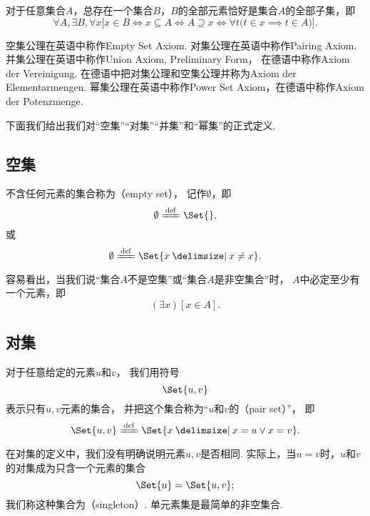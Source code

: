 \begin{axiom}[幂集公理]
	对于任意集合\(A\)，总存在一个集合\(B\)，\(B\)的全部元素恰好是集合\(A\)的全部子集，即\[
	\forall A, \exists B, \forall x \bigl[
		x \in B
		\iff
		x \subseteq A
		\iff
		A \supseteq x
		\iff
		\forall t \bigl( t \in x \implies t \in A \bigr)
	\bigr].
\]
\end{axiom}


空集公理在英语中称作Empty Set Axiom.
对集公理在英语中称作Pairing Axiom.
并集公理在英语中称作Union Axiom, Preliminary Form，
在德语中称作Axiom der Vereinigung.
在德语中把对集公理和空集公理并称为Axiom der Elementarmengen.
幂集公理在英语中称作Power Set Axiom，在德语中称作Axiom der Potenzmenge.

下面我们给出我们对“空集”“对集”“并集”和“幂集”的正式定义.

\subsection{空集}
\begin{definition}
不含任何元素的集合称为（empty set），
记作\(\emptyset\)，即
\begin{equation}
	\emptyset \defeq \Set{},
\end{equation}
或
\begin{equation}
	\emptyset \defeq \Set{ x \given x \neq x }.
\end{equation}
\end{definition}

容易看出，当我们说“集合\(A\)不是空集”或“集合\(A\)是非空集合”时，
\(A\)中必定至少有一个元素，即\[
	(\exists x)[x \in A].
\]

\subsection{对集}
\begin{definition}
对于任意给定的元素\(u\)和\(v\)，
我们用符号\[
	\Set{ u, v }
\]表示只有\(u,v\)元素的集合，
并把这个集合称为“\(u\)和\(v\)的（pair set）”，
即\[
	\Set{ u, v } \defeq \Set{ x \given x = u \lor x = v }.
\]
\end{definition}
在对集的定义中，我们没有明确说明元素\(u,v\)是否相同.
实际上，当\(u=v\)时，\(u\)和\(v\)的对集成为只含一个元素的集合\[
	\Set{ u } = \Set{ u, v };
\]
我们称这种集合为（singleton）.
单元素集是最简单的非空集合.

